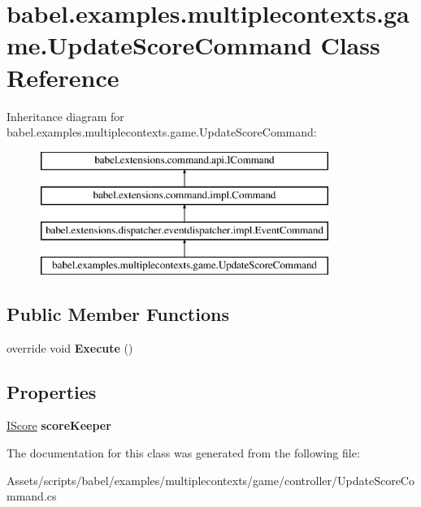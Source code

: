 \hypertarget{classbabel_1_1examples_1_1multiplecontexts_1_1game_1_1_update_score_command}{\section{babel.\-examples.\-multiplecontexts.\-game.\-Update\-Score\-Command Class Reference}
\label{classbabel_1_1examples_1_1multiplecontexts_1_1game_1_1_update_score_command}
}
Inheritance diagram for babel.\-examples.\-multiplecontexts.\-game.\-Update\-Score\-Command\-:\begin{figure}[H]
\begin{center}
\leavevmode
\includegraphics[height=4.000000cm]{classbabel_1_1examples_1_1multiplecontexts_1_1game_1_1_update_score_command}
\end{center}
\end{figure}
\subsection*{Public Member Functions}
\begin{DoxyCompactItemize}
\item 
\hypertarget{classbabel_1_1examples_1_1multiplecontexts_1_1game_1_1_update_score_command_a024c2ea58ed031b2ca7603482476074d}{override void {\bfseries Execute} ()}\label{classbabel_1_1examples_1_1multiplecontexts_1_1game_1_1_update_score_command_a024c2ea58ed031b2ca7603482476074d}

\end{DoxyCompactItemize}
\subsection*{Properties}
\begin{DoxyCompactItemize}
\item 
\hypertarget{classbabel_1_1examples_1_1multiplecontexts_1_1game_1_1_update_score_command_addddabc17266b4336bb48924279540a3}{\hyperlink{interfacebabel_1_1examples_1_1multiplecontexts_1_1game_1_1_i_score}{I\-Score} {\bfseries score\-Keeper}}\label{classbabel_1_1examples_1_1multiplecontexts_1_1game_1_1_update_score_command_addddabc17266b4336bb48924279540a3}

\end{DoxyCompactItemize}


The documentation for this class was generated from the following file\-:\begin{DoxyCompactItemize}
\item 
Assets/scripts/babel/examples/multiplecontexts/game/controller/Update\-Score\-Command.\-cs\end{DoxyCompactItemize}
